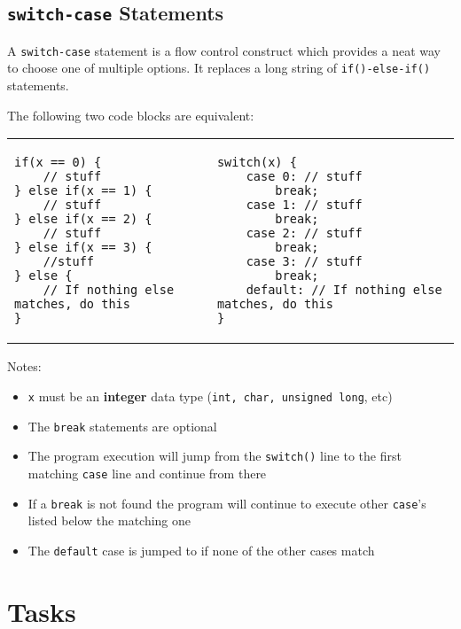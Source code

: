 \documentclass{lab}
\begin{document}
\pagebreak
\subsection{\texttt{switch-case} Statements}

A \texttt{switch-case} statement is a flow control construct which provides a neat way to choose one of multiple options. It replaces a long string of \texttt{if()-else-if()} statements.

The following two code blocks are equivalent:

\begin{table}[H]
\begin{tabular}{l|l}
\begin{lstlisting}[style=Ctable]
if(x == 0) {
	// stuff
} else if(x == 1) {
	// stuff
} else if(x == 2) {
	// stuff
} else if(x == 3) {
	//stuff
} else {
	// If nothing else matches, do this
}
\end{lstlisting} &

\begin{lstlisting}[style=Ctable]
switch(x) {
	case 0: // stuff
		break;
	case 1: // stuff
		break;
	case 2: // stuff
		break;
	case 3: // stuff
		break;
	default: // If nothing else matches, do this
}
\end{lstlisting}
\end{tabular}
\end{table}

Notes:
\begin{itemize}
\item \texttt{x} must be an  \textbf{integer} data type (\texttt{int, char, unsigned long}, etc)
\item The \texttt{break} statements are optional
\item The program execution will jump from the \texttt{switch()} line to the first matching \texttt{case} line and continue from there
\item If a \texttt{break} is not found the program will continue to execute other \texttt{case}'s listed below the matching one
\item The \texttt{default} case is jumped to if none of the other cases match
\end{itemize}

\pagebreak
\section{Tasks}
\end{document}
